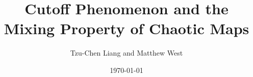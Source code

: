 \documentclass{article}
\title{Cutoff Phenomenon and the Mixing Property of Chaotic Maps}
\author{Tzu-Chen Liang and Matthew West}
\date{\today}
\begin{document}
\maketitle
\begin{abstract}

\end{abstract}















%

\end{document}
